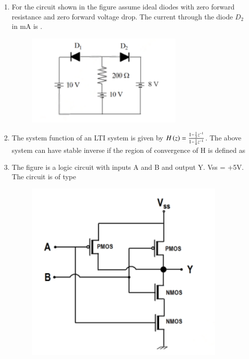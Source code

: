 \documentclass[journal,12pt,onecolumn]{IEEEtran}
\theoremstyle{remark}
\begin{document}
\begin{enumerate}
    \item For the circuit shown in the figure assume ideal diodes with zero forward resistance and zero forward voltage drop. The current through the diode $D_2$ in mA is \underline{\hspace{2cm}}.
    \begin{figure}[H]
        \centering
        \includegraphics[width=0.4\columnwidth]{q15}
        \caption*{}
        \label{Q15}
    \end{figure}
    \hfill{}
    
    \item The system function of an LTI system is given by $H\left(z\right) = \frac{1 - \frac{1}{3}z^{-1}}{1 - \frac{1}{4}z^{-1}}$. The above system can have stable inverse if the region of convergence of H is defined as

    \hfill{}
        \begin{enumerate}
        \end{enumerate}
    
    \item The figure is a logic circuit with inputs A and B and output Y. Vss = +5V. The circuit is of type
    \begin{figure}[H]
        \centering
        \includegraphics[width=0.4\columnwidth]{q17}
        \caption*{}
        \label{Q17}
    \end{figure}


\end{enumerate}
\end{document}
